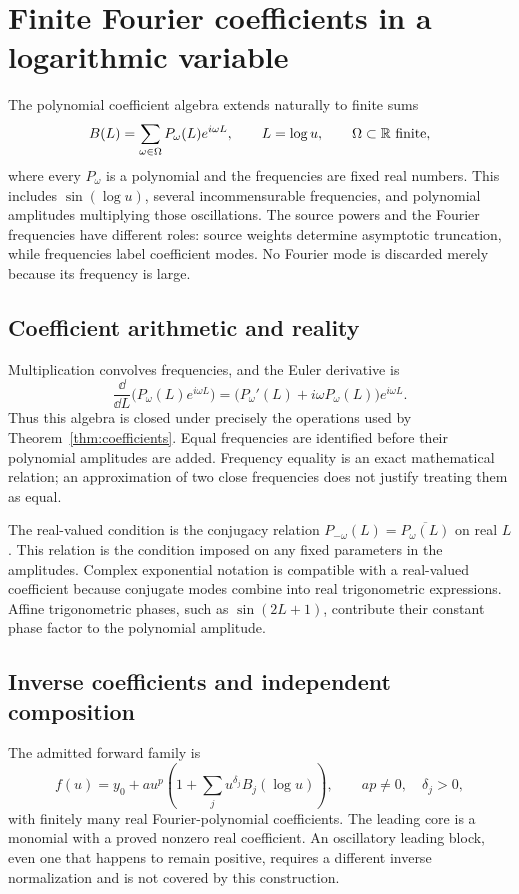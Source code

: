 \section{Finite Fourier coefficients in a logarithmic variable}
\label{sec:fourier-coefficients}

The polynomial coefficient algebra extends naturally to finite sums
\[
 B(L)=\sum_{\omega\in\Omega}P_\omega(L)e^{i\omega L},
 \qquad L=\log u,\qquad \Omega\subset\mathbb R\text{ finite},
\]
where every $P_\omega$ is a polynomial and the frequencies are fixed real
numbers. This includes $\sin(\log u)$, several incommensurable frequencies,
and polynomial amplitudes multiplying those oscillations. The source powers
and the Fourier frequencies have different roles: source weights determine
asymptotic truncation, while frequencies label coefficient modes. No Fourier
mode is discarded merely because its frequency is large.

\subsection{Coefficient arithmetic and reality}

Multiplication convolves frequencies, and the Euler derivative is
\[
 \frac{\dd}{\dd L}\bigl(P_\omega(L)e^{i\omega L}\bigr)
 =\bigl(P_\omega'(L)+i\omega P_\omega(L)\bigr)e^{i\omega L}.
\]
Thus this algebra is closed under precisely the operations used by
Theorem~\ref{thm:coefficients}. Equal frequencies are identified before
their polynomial amplitudes are added. Frequency equality is an exact
mathematical relation; an approximation of two close frequencies does not
justify treating them as equal.

The real-valued condition is the conjugacy relation
$P_{-\omega}(L)=\overline{P_\omega(L)}$ on real $L$. This relation is the condition imposed on any fixed
parameters in the amplitudes. Complex exponential notation is compatible
with a real-valued coefficient because conjugate modes combine into real
trigonometric expressions. Affine trigonometric phases, such as $\sin(2L+1)$, contribute their
constant phase factor to the polynomial amplitude.

\subsection{Inverse coefficients and independent composition}

The admitted forward family is
\[
 f(u)=y_0+a u^p\left(1+\sum_j u^{\delta_j}B_j(\log u)\right),
 \qquad ap\ne0,\quad \delta_j>0,
\]
with finitely many real Fourier-polynomial coefficients. The leading core is
a monomial with a proved nonzero real coefficient. An oscillatory leading
block, even one that happens to remain positive, requires a different inverse
normalization and is not covered by this construction.


